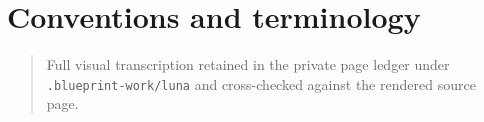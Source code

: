 \section*{Conventions and terminology}\label{mcrt-conventions}\uses{}\begin{quote}Full visual transcription retained in the private page ledger under \texttt{.blueprint-work/luna} and cross-checked against the rendered source page.\end{quote}
